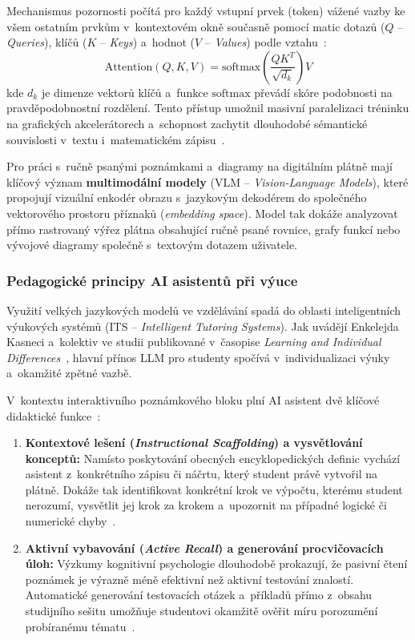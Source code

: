 \documentclass[12pt, a4paper, oneside]{article}
\begin{document}
Mechanismus pozornosti počítá pro každý vstupní prvek (token) vážené vazby ke všem ostatním prvkům v~kontextovém okně současně pomocí matic dotazů ($Q$ -- \textit{Queries}), klíčů ($K$ -- \textit{Keys}) a~hodnot ($V$ -- \textit{Values}) podle vztahu~\cite{vaswani2017attention}:
\begin{equation}
    \text{Attention}(Q, K, V) = \text{softmax}\!\left(\frac{QK^T}{\sqrt{d_k}}\right)V
    \label{eq:attention}
\end{equation}
kde $d_k$ je dimenze vektorů klíčů a~funkce $\text{softmax}$ převádí skóre podobnosti na pravděpodobnostní rozdělení. Tento přístup umožnil masivní paralelizaci tréninku na grafických akcelerátorech a~schopnost zachytit dlouhodobé sémantické souvislosti v~textu i~matematickém zápisu~\cite{vaswani2017attention}.

Pro práci s~ručně psanými poznámkami a~diagramy na digitálním plátně mají klíčový význam \textbf{multimodální modely} (VLM -- \textit{Vision-Language Models}), které propojují vizuální enkodér obrazu s~jazykovým dekodérem do společného vektorového prostoru příznaků (\textit{embedding space}). Model tak dokáže analyzovat přímo rastrovaný výřez plátna obsahující ručně psané rovnice, grafy funkcí nebo vývojové diagramy společně s~textovým dotazem uživatele.

\subsubsection{Pedagogické principy AI asistentů při výuce}
\label{sec:teorie_ai_edukace}

Využití velkých jazykových modelů ve vzdělávání spadá do oblasti inteligentních výukových systémů (ITS -- \textit{Intelligent Tutoring Systems}). Jak uvádějí Enkelejda Kasneci a~kolektiv ve studii publikované v~časopise \textit{Learning and Individual Differences}~\cite{kasneci2023chatgpt}, hlavní přínos LLM pro studenty spočívá v~individualizaci výuky a~okamžité zpětné vazbě.

V~kontextu interaktivního poznámkového bloku plní AI asistent dvě klíčové didaktické funkce~\cite{kasneci2023chatgpt}:
\begin{enumerate}
    \item \textbf{Kontextové lešení (\textit{Instructional Scaffolding}) a vysvětlování konceptů:} Namísto poskytování obecných encyklopedických definic vychází asistent z~konkrétního zápisu či náčrtu, který student právě vytvořil na plátně. Dokáže tak identifikovat konkrétní krok ve výpočtu, kterému student nerozumí, vysvětlit jej krok za krokem a~upozornit na případné logické či numerické chyby~\cite{kasneci2023chatgpt}.
    \item \textbf{Aktivní vybavování (\textit{Active Recall}) a generování procvičovacích úloh:} Výzkumy kognitivní psychologie dlouhodobě prokazují, že pasivní čtení poznámek je výrazně méně efektivní než aktivní testování znalostí. Automatické generování testovacích otázek a~příkladů přímo z~obsahu studijního sešitu umožňuje studentovi okamžitě ověřit míru porozumění probíranému tématu~\cite{kasneci2023chatgpt}.
\end{enumerate}
\end{document}
